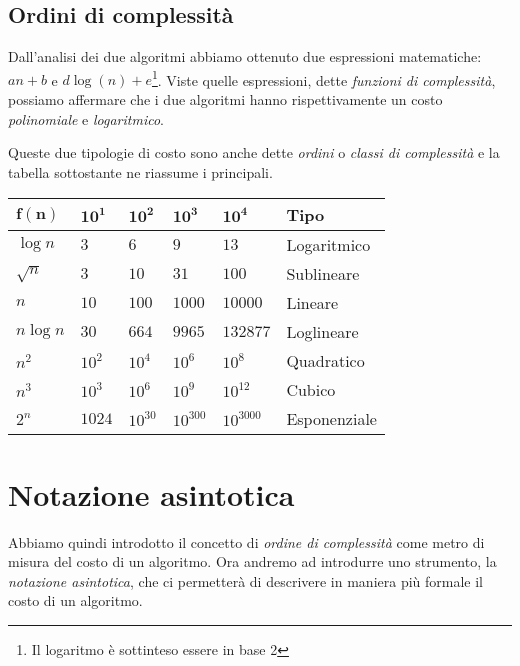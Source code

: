 \subsection{Ordini di complessità}
Dall'analisi dei due algoritmi abbiamo ottenuto due espressioni matematiche:
$an+b$ e $d\log(n)+e$\footnote{Il logaritmo è sottinteso essere in base 2}.
Viste quelle espressioni, dette \emph{funzioni di complessità}, possiamo affermare
che i due algoritmi hanno rispettivamente un costo \emph{polinomiale} e
\emph{logaritmico}.

Queste due tipologie di costo sono anche dette \emph{ordini} o \emph{classi di
complessità} e la tabella sottostante ne riassume i principali.
\begin{table}[h]
    \centering
    \renewcommand{\arraystretch}{1.2}
    \begin{tabular}{|l|l|l|l|l|l|}
    \hline
    $\mathbf{f(n)}$ & $\mathbf{10^1}$ & $\mathbf{10^2}$ & $\mathbf{10^3}$ & $\mathbf{10^4}$ & \textbf{Tipo} \\ \hline
    $\log n$        & $3$             & $6$             & $9$             & $13$            & Logaritmico   \\ \hline
    $\sqrt{n}$      & $3$             & $10$            & $31$            & $100$           & Sublineare    \\ \hline
    $n$             & $10$            & $100$           & $1000$          & $10000$         & Lineare       \\ \hline
    $n\log n$       & $30$            & $664$           & $9965$          & $132877$        & Loglineare    \\ \hline
    $n^2$           & $10^2$          & $10^4$          & $10^6$          & $10^8$          & Quadratico    \\ \hline
    $n^3$           & $10^3$          & $10^6$          & $10^9$          & $10^{12}$       & Cubico        \\ \hline
    $2^n$           & $1024$          & $10^{30}$       & $10^{300}$      & $10^{3000}$     & Esponenziale  \\ \hline
    \end{tabular}
\end{table}

\section{Notazione asintotica}
Abbiamo quindi introdotto il concetto di \emph{ordine di complessità} come metro
di misura del costo di un algoritmo. Ora andremo ad introdurre uno strumento, la
\emph{notazione asintotica}, che ci permetterà di descrivere in maniera più
formale il costo di un algoritmo.

